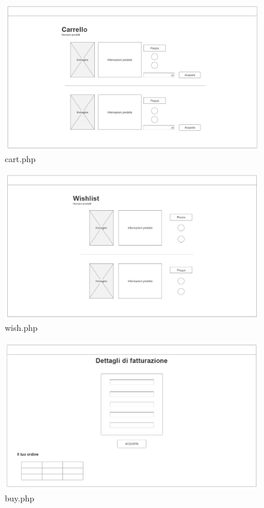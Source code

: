 \documentclass[14pt]{extarticle}
\begin{document}
\begin{figure}
    \includegraphics[width=\linewidth]{mocanu/mockup/Carrello.png}
    \caption{cart.php}
    \label{fig:cart.php}
\end{figure}
\begin{figure}
    \includegraphics[width=\linewidth]{mocanu/mockup/wishlist.png}
    \caption{wish.php}
    \label{fig:wish.php}
\end{figure}
\begin{figure}
    \includegraphics[width=\linewidth]{mocanu/mockup/Buy.png}
    \caption{buy.php}
    \label{fig:buy.php}
\end{figure}
\end{document}

